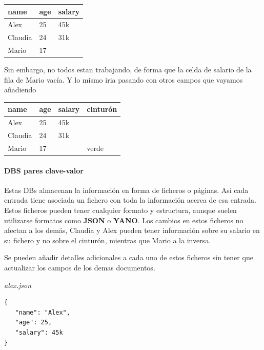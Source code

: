 \documentclass{article}
\newenvironment{codetemplate}[1][]{%
  \mybasecolorbox[#1]
  \itshape
}{%
  \endmybasecolorbox
}
\begin{document}
\begin{table}[H]
\begin{tabular}{| m{5em} | m{1cm}| m{1.5cm} |}
\hline
\textbf{name} & \textbf{age} & \textbf{salary} \\ \hline
Alex  & 25 & 45k \\
\hline
Claudia & 24 & 31k \\
\hline
Mario & 17 &  \\
\hline
\end{tabular}
\end{table}

Sin embargo, no todos estan trabajando, de forma que la celda de salario de la fila de Mario vacía. Y lo mismo iria pasando con otros campos que vayamos añadiendo

\begin{table}[H]
\begin{tabular}{| m{5em} | m{1cm}| m{1.5cm} | m{1.7cm} |}
\hline
\textbf{name} & \textbf{age} & \textbf{salary} & \textbf{cinturón} \\ \hline
Alex  & 25 & 45k &  \\
\hline
Claudia & 24 & 31k &  \\
\hline
Mario & 17 & & verde  \\
\hline
\end{tabular}
\end{table}

\paragraph{DBS pares clave-valor}

Estas DBs almacenan la información en forma de ficheros o páginas. Así cada entrada tiene asociada un fichero con toda la información acerca de esa entrada. Estos ficheros pueden tener cualquier formato y estructura, aunque suelen utilizarse formatos como \textbf{JSON} o \textbf{YANO}. Los cambios en estos ficheros no afectan a los demás, Claudia y Alex pueden tener información sobre su salario en su fichero y no sobre el cinturón, mientras que Mario a la inversa.

Se pueden añadir detalles adicionales a cada uno de estos ficheros sin tener que actualizar los campos de los demas documentos.

\begin{codetemplate}{alex.json}
\begin{verbatim}
{
   "name": "Alex",
   "age": 25,
   "salary": 45k
}
\end{verbatim}
\end{codetemplate}
\end{document}
